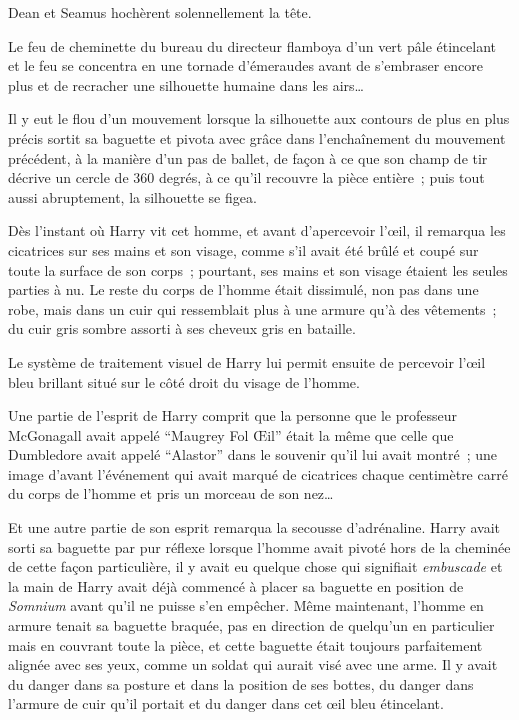Dean et Seamus hochèrent solennellement la tête.


Le feu de cheminette du bureau du directeur flamboya d'un vert pâle étincelant et le feu se concentra en une tornade d'émeraudes avant de s'embraser encore plus et de recracher une silhouette humaine dans les airs…

Il y eut le flou d'un mouvement lorsque la silhouette aux contours de plus en plus précis sortit sa baguette et pivota avec grâce dans l'enchaînement du mouvement précédent, à la manière d'un pas de ballet, de façon à ce que son champ de tir décrive un cercle de 360 degrés, à ce qu'il recouvre la pièce entière~; puis tout aussi abruptement, la silhouette se figea.

Dès l'instant où Harry vit cet homme, et avant d'apercevoir l'œil, il remarqua les cicatrices sur ses mains et son visage, comme s'il avait été brûlé et coupé sur toute la surface de son corps~; pourtant, ses mains et son visage étaient les seules parties à nu.
Le reste du corps de l'homme était dissimulé, non pas dans une robe, mais dans un cuir qui ressemblait plus à une armure qu'à des vêtements~; du cuir gris sombre assorti à ses cheveux gris en bataille.

Le système de traitement visuel de Harry lui permit ensuite de percevoir l'œil bleu brillant situé sur le côté droit du visage de l'homme.

Une partie de l'esprit de Harry comprit que la personne que le professeur McGonagall avait appelé “Maugrey Fol Œil” était la même que celle que Dumbledore avait appelé “Alastor” dans le souvenir qu'il lui avait montré~; une image d'avant l'événement qui avait marqué de cicatrices chaque centimètre carré du corps de l'homme et pris un morceau de son nez…

Et une autre partie de son esprit remarqua la secousse d'adrénaline.
Harry avait sorti sa baguette par pur réflexe lorsque l'homme avait pivoté hors de la cheminée de cette façon particulière, il y avait eu quelque chose qui signifiait \emph{embuscade} et la main de Harry avait déjà commencé à placer sa baguette en position de \emph{Somnium} avant qu'il ne puisse s'en empêcher.
Même maintenant, l'homme en armure tenait sa baguette braquée, pas en direction de quelqu'un en particulier mais en couvrant toute la pièce, et cette baguette était toujours parfaitement alignée avec ses yeux, comme un soldat qui aurait visé avec une arme.
Il y avait du danger dans sa posture et dans la position de ses bottes, du danger dans l'armure de cuir qu'il portait et du danger dans cet œil bleu étincelant.

